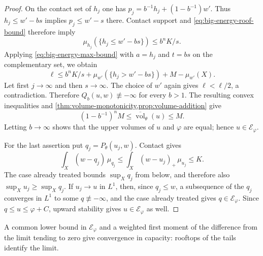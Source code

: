 \begin{proof}
On the contact set of $h_j$ one has
$p_j=b^{-1}h_j+(1-b^{-1})w'$. Thus $h_j\leq w'-bs$ implies $p_j\leq w'-s$ there. Contact support and \eqref{eq:big-energy-roof-bound} therefore imply
\[
 \mu_{h_j}(\{h_j\leq w'-bs\})\leq b^nK/s.
\]
Applying \eqref{eq:big-energy-max-bound} with $a=h_j$ and $t=bs$ on the complementary set, we obtain
\[
 \ell\leq b^nK/s+
     \mu_{w'}(\{h_j>w'-bs\})+M-\mu_{w'}(X).
\]
Let first $j\to\infty$ and then $s\to\infty$. The choice of $w'$ again gives $\ell<\ell/2$, a contradiction. Therefore $Q_b(u,w)\not\equiv-\infty$ for every $b>1$. The resulting convex inequalities and \cref{thm:volume-monotonicity,prop:volume-addition} give
\[
 (1-b^{-1})^n M\leq\overline{\operatorname{vol}}_\theta(u)\leq M.
\]
Letting $b\to\infty$ shows that the upper volumes of $u$ and $\varphi$ are equal; hence $u\in\mathcal E_\varphi$.

For the last assertion put $q_j=P_\theta(u_j,w)$. Contact gives
\[
 \int_X(w-q_j)\,\mu_{q_j}
 \leq\int_X(w-u_j)_+\,\mu_{u_j}\leq K.
\]
The case already treated bounds $\sup_Xq_j$ from below, and therefore also $\sup_Xu_j\geq\sup_Xq_j$. If $u_j\to u$ in $L^1$, then, since $q_j\leq w$, a subsequence of the $q_j$ converges in $L^1$ to some $q\not\equiv-\infty$, and the case already treated gives $q\in\mathcal E_\varphi$. Since $q\leq u\leq\varphi+C$, upward stability gives $u\in\mathcal E_\varphi$ as well.
\end{proof}

A common lower bound in $\mathcal E_\varphi$ and a weighted first moment of the difference from the limit tending to zero give convergence in capacity: rooftops of the tails identify the limit.

